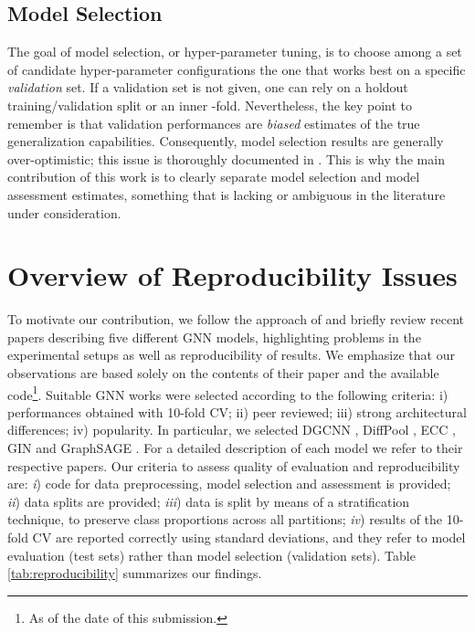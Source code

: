 \documentclass{article}
\begin{document}
\subsection{Model Selection}
\label{sec:model-selection}
The goal of model selection, or hyper-parameter tuning, is to choose among a set of candidate hyper-parameter configurations the one that works best on a specific \textit{validation} set. If a validation set is not given, one can rely on a holdout training/validation split or an inner -fold. Nevertheless, the key point to remember is that validation performances are \textit{biased} estimates of the true generalization capabilities. Consequently, model selection results are generally over-optimistic; this issue is thoroughly documented in \cite{overfitting-model-selection}. This is why the main contribution of this work is to clearly separate model selection and model assessment estimates, something that is lacking or ambiguous in the literature under consideration. \section{Overview of Reproducibility Issues} \label{sec:reproducibility-issues}
To motivate our contribution, we follow the approach of \cite{are-we-really-making-progress} and briefly review recent papers describing five different GNN models, highlighting problems in the experimental setups as well as reproducibility of results. We emphasize that our observations are based solely on the contents of their paper and the available code\footnote{As of the date of this submission.}. Suitable GNN works were selected according to the following criteria: i) performances obtained with 10-fold CV; ii) peer reviewed; iii) strong architectural differences; iv) popularity. In particular, we selected DGCNN \citep{dgcnn}, DiffPool \citep{diffpool}, ECC \citep{ecc}, GIN \citep{how-powerful-gnn} and GraphSAGE \citep{graphsage}. For a detailed description of each model we refer to their respective papers. Our criteria to assess quality of evaluation and reproducibility are: \emph{i}) code for data preprocessing, model selection and assessment is provided; \emph{ii}) data splits are provided; \emph{iii}) data is split by means of a stratification technique, to preserve class proportions across all partitions; \emph{iv}) results of the 10-fold CV are reported correctly using standard deviations, and they refer to model evaluation (test sets) rather than model selection (validation sets). Table \ref{tab:reproducibility} summarizes our findings.
\end{document}
